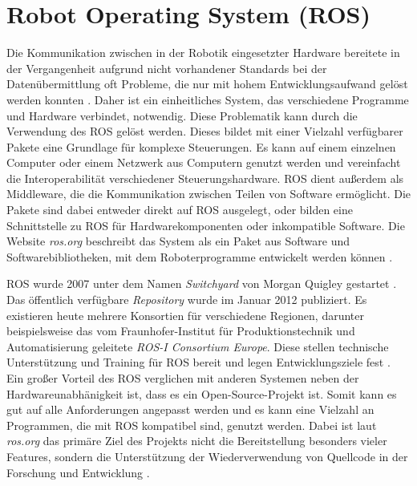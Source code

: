 
\section{Robot Operating System (ROS)} \label{sec:Robot_Operating_System}

Die Kommunikation zwischen in der Robotik eingesetzter Hardware bereitete in der Vergangenheit aufgrund nicht vorhandener Standards bei der Datenübermittlung oft Probleme, die nur mit hohem Entwicklungsaufwand gelöst werden konnten \cite[Kapitel~1]{quigley_ros_2009}. Daher ist ein einheitliches System, das verschiedene Programme und Hardware verbindet, notwendig. Diese Problematik kann durch die Verwendung des \ac{ROS} gelöst werden. Dieses bildet mit einer Vielzahl verfügbarer Pakete eine Grundlage für komplexe Steuerungen. Es kann auf einem einzelnen Computer oder einem Netzwerk aus Computern genutzt werden und vereinfacht die Interoperabilität verschiedener Steuerungshardware. \ac{ROS} dient außerdem als Middleware, die die Kommunikation zwischen Teilen von Software ermöglicht. Die Pakete sind dabei entweder direkt auf \ac{ROS} ausgelegt, oder bilden eine Schnittstelle zu \ac{ROS} für Hardwarekomponenten oder inkompatible Software. Die Website \textit{ros.org} beschreibt das System als ein Paket aus Software und Softwarebibliotheken, mit dem Roboterprogramme entwickelt werden können \cite{rosorg_roshome_2021}.

\ac{ROS} wurde 2007 unter dem Namen \textit{Switchyard} von Morgan Quigley gestartet \cite[Kapitel~1]{joseph_mastering_2018}. Das öffentlich verfügbare \textit{Repository} wurde im Januar 2012 publiziert. Es existieren heute mehrere Konsortien für verschiedene Regionen, darunter beispielsweise das vom Fraunhofer-Institut für Produktionstechnik und Automatisierung geleitete \textit{ROS-I Consortium Europe}. Diese stellen technische Unterstützung und Training für \ac{ROS} bereit und legen Entwicklungsziele fest \cite{rosindustrialorg_brief_nodate}.
Ein großer Vorteil des \ac{ROS} verglichen mit anderen Systemen neben der Hardwareunabhänigkeit ist, dass es ein Open-Source-Projekt ist. Somit kann es gut auf alle Anforderungen angepasst werden und es kann eine Vielzahl an Programmen, die mit \ac{ROS} kompatibel sind, genutzt werden. Dabei ist laut \textit{ros.org} das primäre Ziel des Projekts nicht die Bereitstellung besonders vieler Features, sondern die Unterstützung der Wiederverwendung von Quellcode in der Forschung und Entwicklung \cite[Absatz~2]{dattalo_rosintroduction_2018}.

